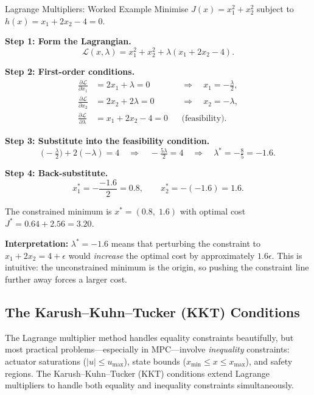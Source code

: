 \begin{examplebox}{Lagrange Multipliers: Worked Example}
	Minimise $J(x) = x_1^2 + x_2^2$ subject to $h(x) = x_1 + 2x_2 - 4 = 0$.

	\solution

	\textbf{Step 1: Form the Lagrangian.}
	\[
	\mathcal{L}(x,\lambda) = x_1^2 + x_2^2 + \lambda(x_1 + 2x_2 - 4).
	\]

	\textbf{Step 2: First-order conditions.}
	\begin{align*}
		\frac{\partial \mathcal{L}}{\partial x_1} &= 2x_1 + \lambda = 0 &&\Longrightarrow \quad x_1 = -\tfrac{\lambda}{2}, \\[4pt]
		\frac{\partial \mathcal{L}}{\partial x_2} &= 2x_2 + 2\lambda = 0 &&\Longrightarrow \quad x_2 = -\lambda, \\[4pt]
		\frac{\partial \mathcal{L}}{\partial \lambda} &= x_1 + 2x_2 - 4 = 0 &&\text{(feasibility)}.
	\end{align*}

	\textbf{Step 3: Substitute into the feasibility condition.}
	\[
	\bigl(-\tfrac{\lambda}{2}\bigr) + 2(-\lambda) = 4 \quad\Longrightarrow\quad -\tfrac{5\lambda}{2} = 4 \quad\Longrightarrow\quad \lambda^* = -\tfrac{8}{5} = -1.6.
	\]

	\textbf{Step 4: Back-substitute.}
	\[
	x_1^* = -\frac{-1.6}{2} = 0.8, \qquad x_2^* = -(-1.6) = 1.6.
	\]

	The constrained minimum is $x^* = (0.8,\; 1.6)$ with optimal cost $J^* = 0.64 + 2.56 = 3.20$.

	\textbf{Interpretation:} $\lambda^* = -1.6$ means that perturbing the constraint to $x_1 + 2x_2 = 4 + \epsilon$ would \emph{increase} the optimal cost by approximately $1.6\epsilon$. This is intuitive: the unconstrained minimum is the origin, so pushing the constraint line further away forces a larger cost.
\end{examplebox}



\subsection{The Karush--Kuhn--Tucker (KKT) Conditions}

The Lagrange multiplier method handles equality constraints beautifully, but most practical problems---especially in MPC---involve \emph{inequality} constraints: actuator saturations ($|u| \le u_{\max}$), state bounds ($x_{\min} \le x \le x_{\max}$), and safety regions. The Karush--Kuhn--Tucker (KKT) conditions extend Lagrange multipliers to handle both equality and inequality constraints simultaneously.


